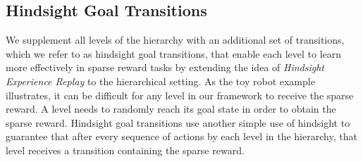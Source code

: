 \documentclass{article} %
\begin{document}

\subsection{Hindsight Goal Transitions}

We supplement all levels of the hierarchy with an additional set of transitions, which we refer to as hindsight goal transitions, that enable each level to learn more effectively in sparse reward tasks by extending the idea of \textit{Hindsight Experience Replay} \citep{Andrychowicz2017HindsightER} to the hierarchical setting.  As the toy robot example illustrates, it can be difficult for any level in our framework to receive the sparse reward.  A level needs to randomly reach its goal state in order to obtain the sparse reward.  Hindsight goal transitions use another simple use of hindsight to guarantee that after every sequence of actions by each level in the hierarchy, that level receives a transition containing the sparse reward.  
\end{document}

